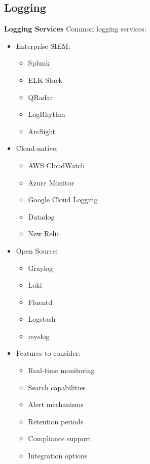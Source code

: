 \subsection{Logging}

\textbf{Logging Services}
Common logging services:

\begin{itemize}
  \item Enterprise SIEM:
  \begin{itemize}
    \tightlist
		\item Splunk
		\item ELK Stack
		\item QRadar
		\item LogRhythm
		\item ArcSight
  \end{itemize}

  \item Cloud-native:
  \begin{itemize}
    \tightlist
		\item AWS CloudWatch
		\item Azure Monitor
		\item Google Cloud Logging
		\item Datadog
		\item New Relic
  \end{itemize}

  \item Open Source:
  \begin{itemize}
    \tightlist
		\item Graylog
		\item Loki
		\item Fluentd
		\item Logstash
		\item rsyslog
  \end{itemize}

  \item Features to consider:
  \begin{itemize}
    \tightlist
		\item Real-time monitoring
		\item Search capabilities
		\item Alert mechanisms 
		\item Retention periods
		\item Compliance support
		\item Integration options
  \end{itemize}
\end{itemize}


